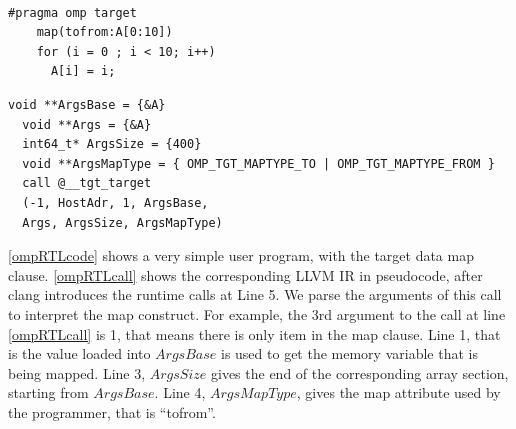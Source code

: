 \begin{minipage}{.40\textwidth}    
\begin{lstlisting}[style=customc, frame=tlrb, caption={Example map clause}, basicstyle=\scriptsize, label=ompRTLcode]

#pragma omp target
    map(tofrom:A[0:10])
    for (i = 0 ; i < 10; i++)
      A[i] = i;
\end{lstlisting}
\end{minipage}\hfill 
\begin{minipage}{.45\textwidth}
\begin{lstlisting}[style=customc, frame=tlrb, caption={Pseudocode for LLVM IR with RTL calls}, basicstyle=\scriptsize, label=ompRTLcall]
  void **ArgsBase = {&A}
  void **Args = {&A}
  int64_t* ArgsSize = {400}
  void **ArgsMapType = { OMP_TGT_MAPTYPE_TO | OMP_TGT_MAPTYPE_FROM }
  call @__tgt_target
  (-1, HostAdr, 1, ArgsBase, 
  Args, ArgsSize, ArgsMapType) 
\end{lstlisting}
\end{minipage}

\autoref{ompRTLcode} shows a very simple user program, with the target data map clause. 
\autoref{ompRTLcall} shows the corresponding LLVM IR in
pseudocode, after clang introduces the runtime calls at  
Line 5.
We parse the arguments 
of this call to interpret the map construct. 
For example, the 3rd argument to the call at line \autoref{ompRTLcall} is 1, that means there
is only item in the map clause. Line 1, that is the value loaded into $ArgsBase$ 
is used to get the memory variable that is being mapped. Line 3, $ArgsSize$ gives
the end of the corresponding array section, starting from $ArgsBase$. 
Line 4, $ArgsMapType$, gives the map attribute used by the programmer, that is ``tofrom''.

